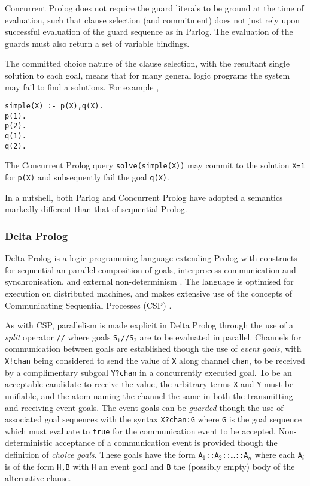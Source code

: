 Concurrent Prolog does not require the guard literals to be ground at the time of
evaluation, such that clause selection (and commitment) does not just rely upon
successful evaluation of the guard sequence as in Parlog.  The evaluation of the
guards must also return a set of variable bindings.

The committed choice nature of the clause selection, with the resultant single solution to
each goal, means that for many general logic programs the system may fail to
find a solutions.  For example \cite{Wis86},
\begin{verbatim}
simple(X) :- p(X),q(X).
p(1).
p(2).
q(1).
q(2).
\end{verbatim}
The Concurrent Prolog query \texttt{solve(simple(X))} may commit to the solution
\texttt{X=1} for \texttt{p(X)} and subsequently fail the goal \texttt{q(X)}.

In a nutshell, both Parlog and Concurrent Prolog have adopted a semantics markedly
different than that of sequential Prolog.

\subsubsection{Delta Prolog}


Delta Prolog is a logic programming language extending Prolog with constructs for
sequential an parallel composition of goals, interprocess communication and
synchronisation, and external non-determinism \cite{CMCP92}.  The language is
optimised for execution on distributed machines, and makes extensive use of the
concepts of Communicating Sequential Processes (CSP) \cite{Hoa85}.

As with CSP, parallelism is made explicit in Delta Prolog through the use of a 
\textit{split} operator \texttt{//} where goals \texttt{S$_1$//S$_2$} are to be
evaluated in parallel.  Channels for communication between goals are established 
though the use of \textit{event goals}, with \texttt{X!chan} being considered to
send the value of \texttt{X} along channel \texttt{chan}, to be received by a
complimentary subgoal \texttt{Y?chan} in a concurrently executed goal.  To be an
acceptable candidate to receive the value, the 
arbitrary terms \texttt{X} and \texttt{Y} must
be unifiable, and the atom naming the channel the same in both the transmitting and
receiving event goals.
The event goals can be \textit{guarded} though the use of associated goal sequences
with the syntax \texttt{X?chan:G} where \texttt{G} is the goal sequence which must
evaluate to \texttt{true} for the communication event to be accepted.  Non-deterministic
acceptance of a communication event is provided though the definition of \textit{choice
goals}.  These goals have the form \texttt{A$_1$::A$_2$::\ldots::A$_n$} where each
\texttt{A$_i$} is of the form \texttt{H,B} with \texttt{H} an event goal and \texttt{B}
the (possibly empty) body of the alternative clause.

